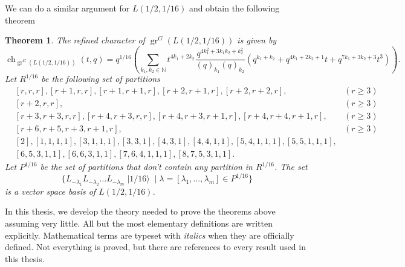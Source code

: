 \documentclass[a4paper, 12pt, reqno]{amsart}
\newtheorem{theorem}{Theorem}[section]
\theoremstyle{remark}
\numberwithin{equation}{subsection}
\DeclareMathOperator{\gr}{gr}
\DeclareMathOperator{\ch}{ch}
\DeclareMathOperator{\vacsixteen}{|1/16\rangle}
\begin{document}
We can do a similar argument for $L(1/2, 1/16)$ and obtain the following theorem

\begin{theorem}
  \label{thr:5}
  The refined character of $\gr^G(L(1/2, 1/16))$ is given by
  \begin{equation*}
    \ch_{\gr^G(L(1/2, 1/16))}(t, q) = q^{1/16}\left(\sum_{k_1, k_2 \in \mathbb{N}}t^{4k_1 + 2k_2}\frac{q^{4k_1^2 + 3k_1k_2 + k_2^2}}{(q)_{k_1}(q)_{k_2}}(q^{k_1 + k_2} + q^{4k_1 + 2k_2 + 1}t + q^{7k_1 + 3k_2 + 3}t^3)\right).
  \end{equation*}
  Let $R^{1/16}$ be the following set of partitions
  \begin{align*}
      &[r, r, r], [r + 1, r, r], [r + 1, r + 1, r], [r + 2, r + 1, r], [r + 2, r + 2, r], &(r \ge 3) \\
      &[r + 2, r, r], &(r \ge 3) \\
      &[r + 3, r + 3, r, r], [r + 4, r + 3, r, r],  [r + 4, r + 3, r + 1, r], [r + 4, r + 4, r + 1, r], &(r \ge 3)\\
      &[r + 6, r + 5, r + 3, r + 1, r], &(r \ge 3) \\
      &[2], [1, 1, 1, 1], [3, 1, 1, 1], [3, 3, 1], [4, 3, 1], [4, 4, 1, 1], [5, 4, 1, 1, 1], [5, 5, 1, 1, 1], \\
      &[6, 5, 3, 1, 1], [6, 6, 3, 1, 1], [7, 6, 4, 1, 1, 1], [8, 7, 5, 3, 1, 1].
  \end{align*}
  Let $P^{1/16}$ be the set of partitions that don't contain any partition in $R^{1/16}$.
  The set
  \begin{equation*}
    \{L_{-\lambda_1}L_{-\lambda_2}\dots L_{-\lambda_m}\vacsixteen \mid \lambda = [\lambda_1, \dots, \lambda_m] \in P^{1/16}\}
  \end{equation*}
  is a vector space basis of $L(1/2, 1/16)$.
\end{theorem}

In this thesis, we develop the theory needed to prove the theorems above assuming very little.
All but the most elementary definitions are written explicitly.
Mathematical terms are typeset with \emph{italics} when they are officially defined.
Not everything is proved, but there are references to every result used in this thesis.
\end{document}
